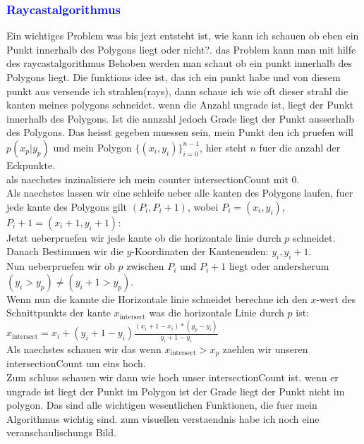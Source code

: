 \documentclass{article}
\begin{document}
\subsubsection{\textcolor{blue}{Raycastalgorithmus}}
Ein wichtiges Problem was bis jezt entsteht ist, wie kann ich schauen ob eben ein Punkt innerhalb des Polygons liegt oder nicht?. das Problem kann man mit hilfe des raycastalgorithmus Behoben werden man schaut ob ein punkt innerhalb des Polygons liegt. Die funktions idee ist, das ich ein punkt habe und von diesem punkt aus versende ich strahlen(rays), dann schaue ich wie oft dieser strahl die kanten meines polygons schneidet. wenn die Anzahl ungrade ist, liegt der Punkt innerhalb des Polygons. Ist die annzahl jedoch Grade liegt der Punkt ausserhalb des Polygons. Das heisst gegeben muessen sein, mein Punkt den ich pruefen will $p(x_p|y_p)$ und mein Polygon \( \{ (x_i, y_i) \}_{i=0}^{n-1} \), hier steht $n$ fuer die anzahl der Eckpunkte.
\\
als naechstes inzinalisiere ich mein counter intersectionCount mit 0.
\\
Als naechstes lassen wir eine schleife ueber alle kanten des Polygons laufen, fuer jede kante des Polygons gilt $(P_i,P_i+1)$, wobei $P_i = (x_i,y_i)$, $P_i+1 = (x_i+1, y_i+1)$: 
\\
Jetzt ueberpruefen wir jede kante ob die horizontale linie durch $p$ schneidet.
\\
Danach Bestimmen wir die $y$-Koordinaten der Kantenenden: $y_i, y_i+1$.
\\
Nun ueberpruefen wir ob $p$ zwischen $P_i$ und $P_i+1$ liegt oder andersherum $(y_i > y_p) \neq (y_i+1 > y_p)$.
\\
Wenn nun die kannte die Horizontale linie schneidet berechne ich den $x$-wert des Schnittpunkts der kante $x_\text{intersect}$ was die horizontale Linie durch $p$ ist:
\\
$x_\text{intersect} = x_i + (y_i+1 - y_i)\frac{(x_i+1 - x_i) * (y_p - y_i)}{y_i+1 - y_i}$
\\
Als naechstes schauen wir das wenn $x_\text{intersect} > x_p$ zaehlen wir unseren intersectionCount um eins hoch.
\\
Zum schluss schauen wir dann wie hoch unser intersectionCount ist.  wenn er ungrade ist liegt der Punkt im Polygon ist der Grade liegt der Punkt nicht im polygon. Das sind alle wichtigen wesentlichen Funktionen, die fuer mein Algorithmus wichtig sind. zum visuellen verstaendnis habe ich noch eine veranschaulischungs Bild.
\end{document}
